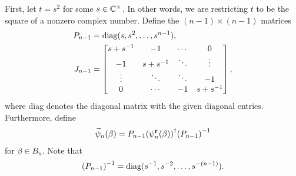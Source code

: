 
First, let $t=s^2$ for some $s\in\mathbb{C}^\times$. In other words, we are restricting $t$ to be the square of a nonzero complex number. Define the $(n-1)\times (n-1)$ matrices
\begin{align}
    P_{n-1} &= \textrm{diag}(s,s^2,\dots,s^{n-1}), \\
    J_{n-1} &= \begin{bmatrix}
        s+{ s }^{-1} & -1 & \cdots & 0 \\
        -1 & s+{ s }^{-1} & \ddots & \vdots \\
        \vdots & \ddots & \ddots & -1 \\
        0 & \cdots & -1 & s+{ s }^{-1}
    \end{bmatrix},
\end{align}
where diag denotes the diagonal matrix with the given diagonal entries. Furthermore, define
\begin{align}
    \widetilde{\psi}_n(\beta) = P_{n-1}{\left( \psi_n^\mathbf{r}(\beta) \right)}^\dagger{ \left( P_{n-1} \right) }^{-1}
\end{align}
for $\beta\in B_n$. Note that
\begin{align}
    { \left( P_{n-1} \right) }^{-1} = \textrm{diag}(s^{-1},s^{-2},\dots,s^{-(n-1)}).
\end{align}


